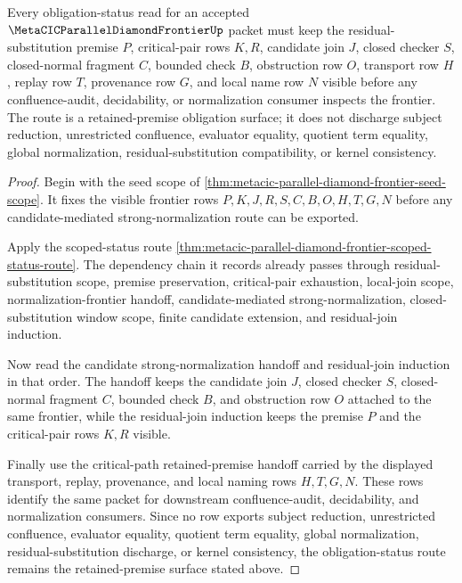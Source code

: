\begin{theorem}
\label{thm:metacic-parallel-diamond-frontier-obligation-status-route}
Every obligation-status read for an accepted $\MetaCICParallelDiamondFrontierUp$ packet must keep the residual-substitution premise $P$, critical-pair rows $K,R$, candidate join $J$, closed checker $S$, closed-normal fragment $C$, bounded check $B$, obstruction row $O$, transport row $H$, replay row $T$, provenance row $G$, and local name row $N$ visible before any confluence-audit, decidability, or normalization consumer inspects the frontier. The route is a retained-premise obligation surface; it does not discharge subject reduction, unrestricted confluence, evaluator equality, quotient term equality, global normalization, residual-substitution compatibility, or kernel consistency.
\end{theorem}
\begin{proof}
Begin with the seed scope of \autoref{thm:metacic-parallel-diamond-frontier-seed-scope}. It fixes the visible frontier rows $P,K,J,R,S,C,B,O,H,T,G,N$ before any candidate-mediated strong-normalization route can be exported.

Apply the scoped-status route \autoref{thm:metacic-parallel-diamond-frontier-scoped-status-route}. The dependency chain it records already passes through residual-substitution scope, premise preservation, critical-pair exhaustion, local-join scope, normalization-frontier handoff, candidate-mediated strong-normalization, closed-substitution window scope, finite candidate extension, and residual-join induction.

Now read the candidate strong-normalization handoff and residual-join induction in that order. The handoff keeps the candidate join $J$, closed checker $S$, closed-normal fragment $C$, bounded check $B$, and obstruction row $O$ attached to the same frontier, while the residual-join induction keeps the premise $P$ and the critical-pair rows $K,R$ visible.

Finally use the critical-path retained-premise handoff carried by the displayed transport, replay, provenance, and local naming rows $H,T,G,N$. These rows identify the same packet for downstream confluence-audit, decidability, and normalization consumers. Since no row exports subject reduction, unrestricted confluence, evaluator equality, quotient term equality, global normalization, residual-substitution discharge, or kernel consistency, the obligation-status route remains the retained-premise surface stated above.
\end{proof}

